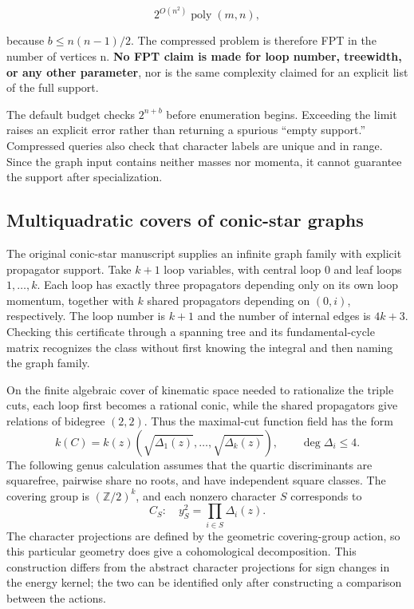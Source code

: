 \documentclass[11pt,a4paper,oneside]{article}
\theoremstyle{plain}
\theoremstyle{definition}
\theoremstyle{remark}
\newcommand{\Z}{\mathbb Z}
\numberwithin{equation}{section}
\begin{document}
\begin{equation}
2^{O(n^2)}\operatorname{poly}(m,n),
\end{equation}

because \(b\le n(n-1)/2\). The compressed problem is therefore FPT in the number of vertices n. \textbf{No FPT claim is made for loop number, treewidth, or any other parameter}, nor is the same complexity claimed for an explicit list of the full support.

The default budget checks \(2^{n+b}\) before enumeration begins. Exceeding the limit raises an explicit error rather than returning a spurious ``empty support.'' Compressed queries also check that character labels are unique and in range. Since the graph input contains neither masses nor momenta, it cannot guarantee the support after specialization.



\subsection{Multiquadratic covers of conic-star graphs}
The original conic-star manuscript supplies an infinite graph family with explicit propagator support. Take $k+1$ loop variables, with central loop $0$ and leaf loops $1,\ldots,k$. Each loop has exactly three propagators depending only on its own loop momentum, together with $k$ shared propagators depending on $(0,i)$, respectively. The loop number is $k+1$ and the number of internal edges is $4k+3$. Checking this certificate through a spanning tree and its fundamental-cycle matrix recognizes the class without first knowing the integral and then naming the graph family.

On the finite algebraic cover of kinematic space needed to rationalize the triple cuts, each loop first becomes a rational conic, while the shared propagators give relations of bidegree $(2,2)$. Thus the maximal-cut function field has the form
\begin{equation}
 k(C)=k(z)(\sqrt{\Delta_1(z)},\ldots,\sqrt{\Delta_k(z)}),
 \qquad\deg\Delta_i\le4.
\end{equation}
The following genus calculation assumes that the quartic discriminants are squarefree, pairwise share no roots, and have independent square classes. The covering group is $(\Z/2)^k$, and each nonzero character $S$ corresponds to
\begin{equation}
 C_S:\quad y_S^2=\prod_{i\in S}\Delta_i(z).
\end{equation}
The character projections are defined by the geometric covering-group action, so this particular geometry does give a cohomological decomposition. This construction differs from the abstract character projections for sign changes in the energy kernel; the two can be identified only after constructing a comparison between the actions.
\end{document}
